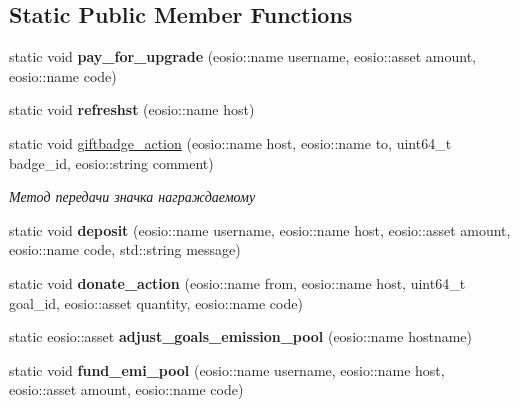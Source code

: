 \subsection*{Static Public Member Functions}
\begin{DoxyCompactItemize}
\item 
\mbox{\label{classeosio_1_1unicore_a825817d204b324d091234b614e1a1d2c}} 
static void {\bfseries pay\+\_\+for\+\_\+upgrade} (eosio\+::name username, eosio\+::asset amount, eosio\+::name code)
\item 
\mbox{\label{classeosio_1_1unicore_ac04e16967482ab1047cb52d1c7cbdb3f}} 
static void {\bfseries refreshst} (eosio\+::name host)
\item 
static void \mbox{\hyperlink{classeosio_1_1unicore_aee33ad5dca93b5f3a55949f20e037569}{giftbadge\+\_\+action}} (eosio\+::name host, eosio\+::name to, uint64\+\_\+t badge\+\_\+id, eosio\+::string comment)
\begin{DoxyCompactList}\small\item\em Метод передачи значка награждаемому \end{DoxyCompactList}\item 
\mbox{\label{classeosio_1_1unicore_af9e73057b6d13746a747a18eae85a568}} 
static void {\bfseries deposit} (eosio\+::name username, eosio\+::name host, eosio\+::asset amount, eosio\+::name code, std\+::string message)
\item 
\mbox{\label{classeosio_1_1unicore_af7540492097061942c8ae03b6121860f}} 
static void {\bfseries donate\+\_\+action} (eosio\+::name from, eosio\+::name host, uint64\+\_\+t goal\+\_\+id, eosio\+::asset quantity, eosio\+::name code)
\item 
\mbox{\label{classeosio_1_1unicore_a25450a101e8b006b07bcd850ddc1bef9}} 
static eosio\+::asset {\bfseries adjust\+\_\+goals\+\_\+emission\+\_\+pool} (eosio\+::name hostname)
\item 
\mbox{\label{classeosio_1_1unicore_ac552f269e13c6434c4a72190836e4a27}} 
static void {\bfseries fund\+\_\+emi\+\_\+pool} (eosio\+::name username, eosio\+::name host, eosio\+::asset amount, eosio\+::name code)
\item 

\end{DoxyCompactItemize}

